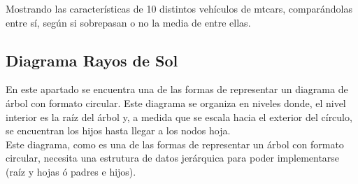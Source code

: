 \documentclass{article}\usepackage[]{graphicx}\usepackage[]{color}
\begin{document}
Mostrando las caracter\'isticas de 10 distintos veh\'iculos de mtcars, compar\'andolas entre s\'i, seg\'un si sobrepasan o no la media de entre ellas.
\clearpage
\subsection{Diagrama Rayos de Sol}\label{ssec:rayosSol}
En este apartado se encuentra una de las formas de representar un diagrama de \'arbol con formato circular. Este diagrama se organiza en niveles donde, el nivel interior es la ra\'iz del \'arbol y, a medida que se escala hacia el exterior del c\'irculo, se encuentran los hijos hasta llegar a los nodos hoja.~\\
Este diagrama, como es una de las formas de representar un \'arbol con formato circular, necesita una estrutura de datos jer\'arquica para poder implementarse (ra\'iz y hojas \'o padres e hijos).
\end{document}

